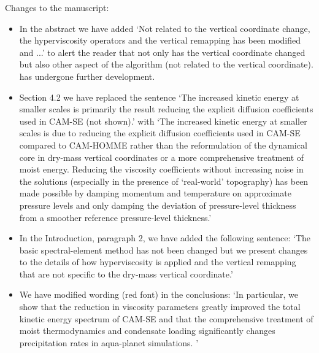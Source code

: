 \documentclass[11pt]{article}
\begin{document}
Changes to the manuscript: 
\begin{itemize}
\item In the abstract we have added `Not related to the vertical coordinate change, the hyperviscosity operators and the vertical remapping has been modified and ...' to alert the reader that not only has the vertical coordinate changed but also other aspect of the algorithm (not related to the vertical coordinate). has undergone further development.
\item Section 4.2 we have replaced the sentence `The increased kinetic energy at smaller scales is primarily the result reducing the explicit diffusion coefficients used in CAM-SE (not shown).' with `The increased kinetic energy at smaller scales is due to reducing the explicit diffusion coefficients used in CAM-SE compared to CAM-HOMME rather than the reformulation of the dynamical core in dry-mass vertical coordinates or a more comprehensive treatment of moist energy. Reducing the viscosity coefficients without increasing noise in the solutions (especially in the presence of `real-world' topography) has been made possible by damping momentum and temperature on approximate pressure levels and only damping the deviation of pressure-level thickness from a smoother reference pressure-level thickness.'
\item In the Introduction, paragraph 2, we have added the following sentence: `The basic spectral-element method has not been changed but we present changes to the details of how hyperviscosity is applied and the vertical remapping that are not specific to the dry-mass vertical coordinate.' 
\item We have modified wording (red font) in the conclusions: `In particular, we show that the reduction in viscosity parameters {\color{red}{(made possible by changes to the details of how hyperviscosity is applied)}} greatly improved the total kinetic energy spectrum of CAM-SE and that the comprehensive treatment of moist thermodynamics and condensate loading significantly changes precipitation rates in aqua-planet simulations. {\color{red}{These changes are not due to the dry-mass vertical coordinate per se but we argue that the comprehensive treatment of energy in the Earth system model as a whole is much simpler in a dry-mass vertical coordinate (for example, a dry-mass vertical coordinate does not change during parameterization updates).}}'


\end{itemize}
\end{document}
